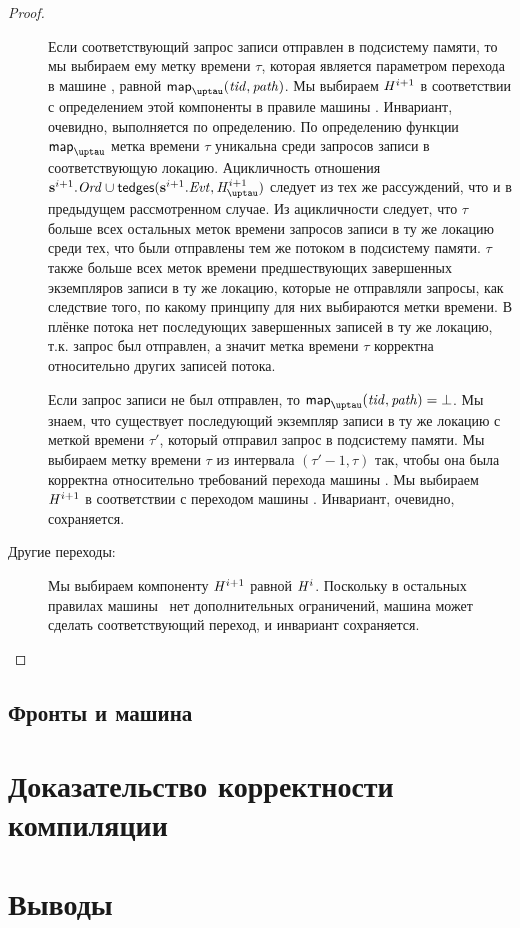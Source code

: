 \begin{proof}
\begin{description}
    Если соответствующий запрос записи отправлен в подсистему памяти, то мы выбираем
    ему метку времени $\tau$, которая является параметром перехода в машине \ARMt,
    равной $\taumapping(\tId, \cpath)$.
    Мы выбираем $\mathit{H}^{i + 1}$ в соответствии с определением этой компоненты в
    правиле  машины \ARMt.
    Инвариант, очевидно, выполняется по определению.
    По определению функции $\taumapping$ метка времени $\tau$ уникальна среди запросов записи
    в соответствующую локацию.
    Ацикличность отношения $\s^{i+1}.\Ord \cup \moTau(\s^{i+1}.\Evt, \tmap^{i + 1})$
    следует из тех же рассуждений, что и в предыдущем рассмотренном случае.
    Из ацикличности следует, что $\tau$ больше всех остальных меток времени
    запросов записи в ту же локацию среди тех, что были отправлены тем же потоком
    в подсистему памяти.
    $\tau$ также больше всех меток времени предшествующих завершенных
    экземпляров записи в ту же локацию, которые не отправляли запросы,
    как следствие того, по какому принципу для них выбираются метки времени.
    В плёнке потока нет последующих завершенных записей в ту же локацию,
    т.к. запрос был отправлен, а значит метка времени $\tau$ корректна относительно
    других записей потока.
    
    Если запрос записи не был отправлен, то $\taumapping(\tId, \cpath) = \bot$.
    Мы знаем, что существует последующий экземпляр записи в ту же локацию с меткой
    времени $\tau'$, который отправил запрос в подсистему памяти.
    Мы выбираем метку времени $\tau$ из интервала $(\tau' - 1, \tau)$ так, чтобы
    она была корректна относительно требований перехода машины \ARMt.
    Мы выбираем $\mathit{H}^{i + 1}$ в соответствии с переходом
     машины \ARMt.
    Инвариант, очевидно, сохраняется.

  \item[Другие переходы:]
    Мы выбираем компоненту $\mathit{H}^{i + 1}$ равной $\mathit{H}^{i}$.
    Поскольку в остальных правилах машины \ARMt~нет дополнительных ограничений,
    машина может сделать соответствующий переход, и инвариант сохраняется.
    \qedhere
  \end{description}
\end{proof}

\subsection{Фронты и машина \ARMt}

\section{Доказательство корректности компиляции}
\section{Выводы}
